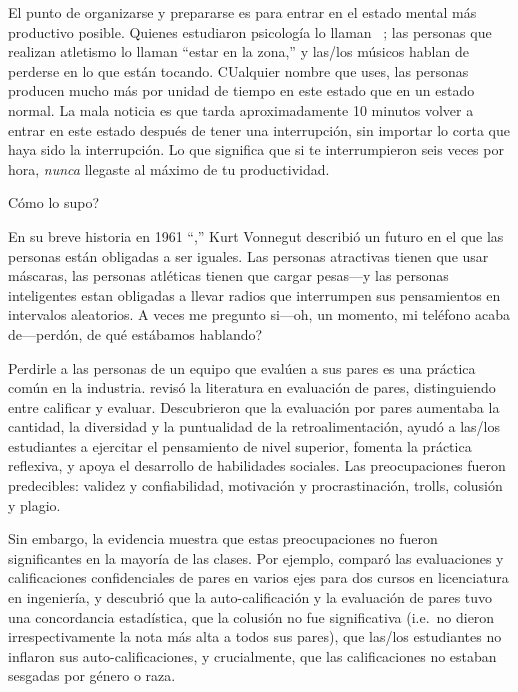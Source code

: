 El punto de organizarse y prepararse es
para entrar en el estado mental más productivo posible.
Quienes estudiaron psicología lo llaman ~\cite{Csik2008};
las personas que realizan atletismo lo llaman ``estar en la zona,''
y las/los músicos hablan de perderse en lo que están tocando.
CUalquier nombre que uses,
las personas producen mucho más por unidad de tiempo en este estado que en un estado normal.
La mala noticia es que
tarda aproximadamente 10 minutos volver a entrar en este estado después de tener una interrupción,
sin importar lo corta que haya sido la interrupción.
Lo que significa que si te interrumpieron seis veces por hora,
\emph{nunca} llegaste al máximo de tu productividad.

\newpage

\begin{aside}{Cómo lo supo?}

  En su breve historia en 1961 ``,''
  Kurt Vonnegut describió un futuro en el que las personas están obligadas a ser iguales.
  Las personas atractivas tienen que usar máscaras,
  las personas atléticas tienen que cargar pesas---y las personas inteligentes
  estan obligadas a llevar radios que interrumpen sus pensamientos en intervalos aleatorios.
  A veces me pregunto si---oh, un momento, mi teléfono acaba de---perdón, de qué estábamos hablando?

\end{aside}


Perdirle a las personas de un equipo que evalúen a sus pares es una práctica común en la industria.
\cite{Sond2012} revisó la literatura en evaluación de pares,
distinguiendo entre calificar y evaluar.
Descubrieron que la evaluación por pares aumentaba la cantidad, la diversidad y la puntualidad de la retroalimentación,
ayudó a las/los estudiantes a ejercitar el pensamiento de nivel superior,
fomenta la práctica reflexiva,
y apoya el desarrollo de habilidades sociales.
Las preocupaciones fueron predecibles:
validez y confiabilidad,
motivación y procrastinación,
trolls, colusión y plagio.

Sin embargo,
la evidencia muestra que estas preocupaciones no fueron significantes en la mayoría de las clases.
Por ejemplo,
\cite{Kauf2000} comparó las evaluaciones y calificaciones confidenciales de pares en varios ejes
para dos cursos en licenciatura en ingeniería,
y descubrió que la auto-calificación y la evaluación de pares tuvo una concordancia estadística,
que la colusión no fue significativa (i.e.\ no dieron irrespectivamente la nota más alta a todos sus pares),
que las/los estudiantes no inflaron sus auto-calificaciones,
y crucialmente,
que las calificaciones no estaban sesgadas por género o raza.

